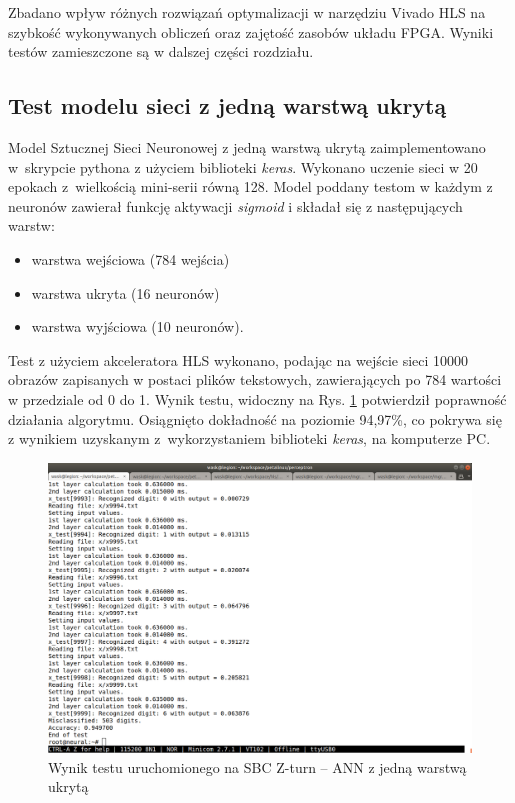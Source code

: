 Zbadano wpływ różnych rozwiązań optymalizacji w narzędziu Vivado HLS na szybkość wykonywanych obliczeń oraz zajętość zasobów układu FPGA.
Wyniki testów zamieszczone są w dalszej części rozdziału.

\subsection{Test modelu sieci z jedną warstwą ukrytą}

Model Sztucznej Sieci Neuronowej z jedną warstwą ukrytą zaimplementowano w~skrypcie pythona z użyciem biblioteki \emph{keras}. Wykonano uczenie sieci w 20 epokach z~wielkością mini-serii równą 128.
Model poddany testom w każdym z neuronów zawierał funkcję aktywacji \emph{sigmoid} i składał się z następujących warstw: 
\begin{itemize}
  \item warstwa wejściowa (784 wejścia)
  \item warstwa ukryta (16 neuronów)
  \item warstwa wyjściowa (10 neuronów).
\end{itemize}

Test z użyciem akceleratora HLS wykonano, podając na wejście sieci 10000 obrazów zapisanych w postaci plików tekstowych, zawierających po 784 wartości w przedziale od 0 do 1. Wynik testu, widoczny na Rys. \ref{wynik1} potwierdził poprawność działania algorytmu. Osiągnięto dokładność na poziomie 94,97\%, co pokrywa się z wynikiem uzyskanym z~wykorzystaniem biblioteki \emph{keras}, na komputerze PC.

\begin{figure}[!h]
  \centering
  \includegraphics[width=\textwidth]{img/wynik1.png}
  \caption{Wynik testu uruchomionego na SBC Z-turn -- ANN z jedną warstwą ukrytą}
  \label{wynik1}
\end{figure}


